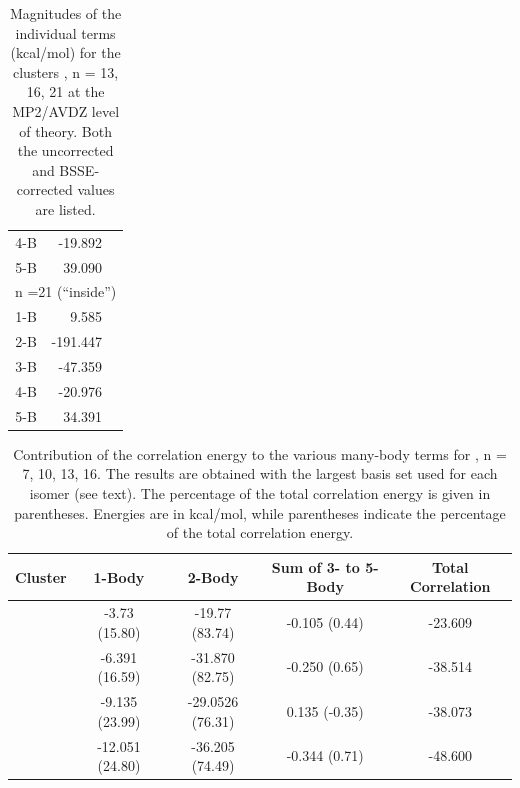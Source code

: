 \documentclass[11pt, proquest]{uwthesis}[2020/02/24]
\let\ce\ch
\begin{document}
\begin{table}[]
\begin{tabular}{@{}rrr@{}}
4-B     & -19.892         &                    \\
5-B     & 39.090          &                    \\
\hline
\multicolumn{3}{c}{n =21 (“inside”)}           \\
\hline
1-B     & 9.585           &                    \\
2-B     & -191.447        &                    \\
3-B     & -47.359         &                    \\
4-B     & -20.976         &                    \\
5-B     & 34.391          &                    \\ \bottomrule
\end{tabular}
\caption[Magnitudes of the individual terms (kcal/mol) for the clusters \ce{(H2O)n}, n = 13, 16, 21 at the MP2/AVDZ level of theory. Both the uncorrected and BSSE-corrected values are listed.]{Magnitudes of the individual terms (kcal/mol) for the clusters \ce{(H2O)n}, n = 13, 16, 21 at the MP2/AVDZ level of theory. Both the uncorrected and BSSE-corrected values are listed.}
\label{tab:MBE_I_T2}
\end{table}

\begin{table}[]
\centering
\begin{tabular}{@{}ccccc@{}}
\toprule
Cluster & 1-Body          & 2-Body           & Sum of 3- to 5-Body & Total Correlation \\ \midrule
\ce{(H2O)7}  & -3.73 (15.80)   & -19.77 (83.74)   & -0.105 (0.44)       & -23.609           \\
\ce{(H2O)_{10}} & -6.391 (16.59)  & -31.870 (82.75)  & -0.250 (0.65)       & -38.514           \\
\ce{(H2O)_{13}} & -9.135 (23.99)  & -29.0526 (76.31) & 0.135 (-0.35)       & -38.073           \\
\ce{(H2O)_{16}} & -12.051 (24.80) & -36.205 (74.49)  & -0.344 (0.71)       & -48.600           \\ \bottomrule
\end{tabular}
\caption[Contribution of the correlation energy to the various many-body terms for \ce{(H2O)n}, n = 7, 10, 13, 16. The results are obtained with the largest basis set used for each isomer (see text). The percentage of the total correlation energy is given in parentheses. Energies are in kcal/mol, while parentheses indicate the percentage of the total correlation energy.]{Contribution of the correlation energy to the various many-body terms for \ce{(H2O)n}, n = 7, 10, 13, 16. The results are obtained with the largest basis set used for each isomer (see text). The percentage of the total correlation energy is given in parentheses. Energies are in kcal/mol, while parentheses indicate the percentage of the total correlation energy.}
\label{tab:MBE_I_T3}
\end{table}
\end{document}
